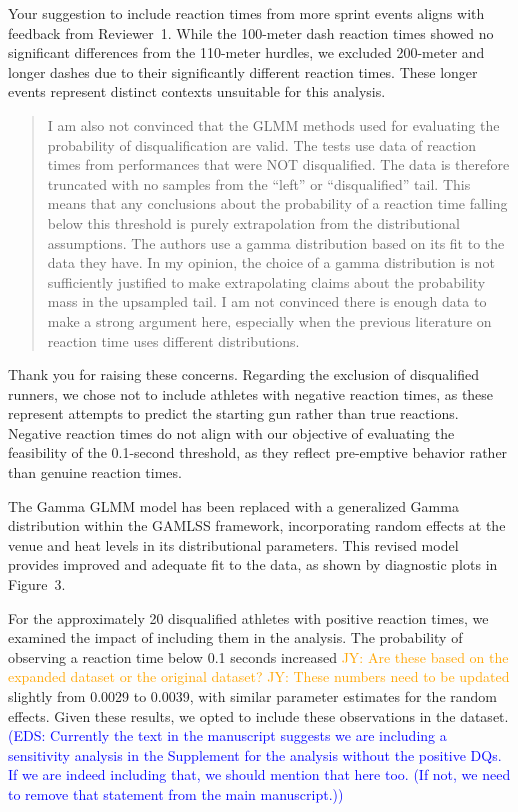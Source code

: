 \documentclass[12pt]{article}
\newcommand{\jy}[1]{\textcolor{orange}{JY: #1}}
\newcommand{\eds}[1]{\textcolor{blue}{(EDS: #1)}}
\newenvironment{comment}%
{\begin{quotation}\noindent\small\it\color{darkblue}\ignorespaces%
}{\end{quotation}}
\begin{document}
Your suggestion to include reaction times from more sprint events aligns 
with feedback from Reviewer~1.  While the 100-meter dash reaction times 
showed no significant differences from the 110-meter hurdles, we excluded 
200-meter and longer dashes due to their significantly different reaction 
times. These longer events represent distinct contexts unsuitable for this 
analysis.


\begin{comment}
I am also not convinced that the GLMM methods used for evaluating the
probability of disqualification are valid. The tests use data of reaction times
from performances that were NOT disqualified.  The data is therefore truncated
with no samples from the “left” or “disqualified” tail. This means that any
conclusions about the probability of a reaction time falling below this
threshold is purely extrapolation from the distributional assumptions. The
authors use a gamma distribution based on its fit to the data they have. In my
opinion, the choice of a gamma distribution is not sufficiently justified to
make extrapolating claims about the probability mass in the upsampled tail. I am
not convinced there is enough data to make a strong argument here, especially
when the previous literature on reaction time uses different distributions.
\end{comment}



Thank you for raising these concerns. Regarding the exclusion of 
disqualified runners, we chose not to include athletes with negative 
reaction times, as these represent attempts to predict the starting gun 
rather than true reactions. Negative reaction times do not align with 
our objective of evaluating the feasibility of the 0.1-second threshold, 
as they reflect pre-emptive behavior rather than genuine reaction
times.


The Gamma GLMM model has been replaced with a generalized Gamma 
distribution within the GAMLSS framework, incorporating random effects 
at the venue and heat levels in its distributional parameters. This 
revised model provides improved and adequate fit to the data, as shown 
by diagnostic plots in Figure~3.


For the approximately 20 disqualified athletes with positive reaction
times, we examined the impact of including them in the analysis. The
probability of observing a reaction time below 0.1 seconds increased
\jy{Are these based on the expanded dataset or the original dataset?}
\jy{These numbers need to be updated}
slightly from 0.0029 to 0.0039, with similar parameter estimates for
the random effects. Given these results, we opted to include these
observations in the dataset.
\eds{Currently the text in the manuscript suggests we are including a 
sensitivity analysis in the Supplement for the analysis without the positive DQs.
If we are indeed including that, we should mention that here too. (If not, we 
need to remove that statement from the main manuscript.)}
\end{document}
